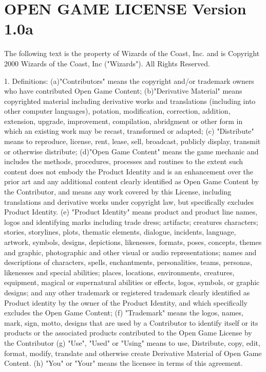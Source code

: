 \section*{OPEN GAME LICENSE Version 1.0a}

The following text is the property of Wizards of the 
Coast, Inc. and is Copyright 2000 Wizards of the 
Coast, Inc ("Wizards"). All Rights Reserved. 

1. Definitions: (a)"Contributors" means the 
copyright and/or trademark owners who have 
contributed Open Game Content; (b)"Derivative 
Material" means copyrighted material including 
derivative works and translations (including into 
other computer languages), potation, modification, 
correction, addition, extension, upgrade, 
improvement, compilation, abridgment or other 
form in which an existing work may be recast, 
transformed or adapted; (c) "Distribute" means to 
reproduce, license, rent, lease, sell, broadcast, 
publicly display, transmit or otherwise distribute; 
(d)"Open Game Content" means the game mechanic 
and includes the methods, procedures, processes 
and routines to the extent such content does not 
embody the Product Identity and is an enhancement 
over the prior art and any additional content clearly 
identified as Open Game Content by the Contributor, 
and means any work covered by this License, 
including translations and derivative works under 
copyright law, but specifically excludes Product 
Identity. (e) "Product Identity" means product and 
product line names, logos and identifying marks 
including trade dress; artifacts; creatures characters; 
stories, storylines, plots, thematic elements, dialogue, 
incidents, language, artwork, symbols, designs, 
depictions, likenesses, formats, poses, concepts, 
themes and graphic, photographic and other visual 
or audio representations; names and descriptions of 
characters, spells, enchantments, personalities, 
teams, personas, likenesses and special abilities; 
places, locations, environments, creatures, 
equipment, magical or supernatural abilities or 
effects, logos, symbols, or graphic designs; and any 
other trademark or registered trademark clearly 
identified as Product identity by the owner of the 
Product Identity, and which specifically excludes the 
Open Game Content; (f) "Trademark" means the 
logos, names, mark, sign, motto, designs that are 
used by a Contributor to identify itself or its 
products or the associated products contributed to 
the Open Game License by the Contributor (g) "Use", 
"Used" or "Using" means to use, Distribute, copy, edit, 
format, modify, translate and otherwise create 
Derivative Material of Open Game Content. (h) "You" 
or "Your" means the licensee in terms of this 
agreement. 

